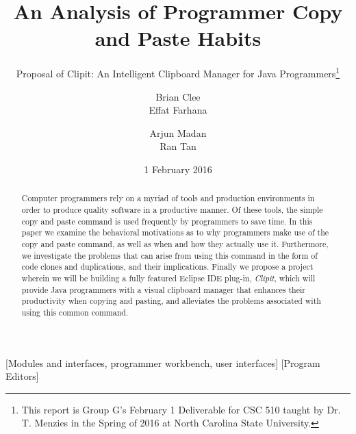 \documentclass{acm_proc_article-sp}
\begin{document}
\title{An Analysis of Programmer Copy and Paste Habits}
\subtitle{Proposal of Clipit: An Intelligent Clipboard Manager for Java Programmers\thanks{This report is Group G's February 1 Deliverable for CSC 510 taught by Dr. T. Menzies in the Spring of 2016 at North Carolina State University.}}

\author{
\alignauthor
Brian Clee\\
\alignauthor
Effat Farhana\\
\and %
\alignauthor
Arjun Madan\\
\alignauthor
Ran Tan\\
}

\date{1 February 2016}
\maketitle

\begin{abstract}
Computer programmers rely on a myriad of tools and production environments in order to produce quality software in a productive manner. Of these tools, the simple copy and paste command is used frequently by programmers to save time. In this paper we examine the behavioral motivations as to why programmers make use of the copy and paste command, as well as when and how they actually use it. Furthermore, we investigate the problems that can arise from using this command in the form of code clones and duplications, and their implications. Finally we propose a project wherein we will be building a fully featured Eclipse IDE plug-in, \textit{Clipit}, which will provide Java programmers with a visual clipboard manager that enhances their productivity when copying and pasting, and alleviates the problems associated with using this common command.
\end{abstract}

[Modules and interfaces, programmer workbench, user interfaces]
[Program Editors]

\end{document}
